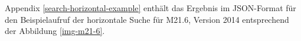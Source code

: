 
Appendix \ref{search-horizontal-example} enthält das Ergebnis im JSON-Format für den Beispielaufruf der horizontale Suche für M21.6, Version 2014
entsprechend der Abbildung \ref{img-m21-6}.

